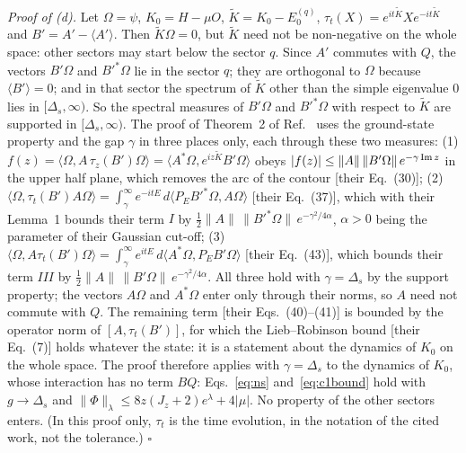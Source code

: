 \documentclass[aps,prx,onecolumn,10pt,nofootinbib,longbibliography,floatfix]{revtex4-2}
\theoremstyle{remark}
\newcommand{\Jz}{J_z}
\begin{document}
\emph{Proof of (d).} Let $\Omega=\psi$, $K_0=H-\mu O$, $\tilde K=K_0-E_0^{(q)}$, $\tau_t(X)=e^{it\tilde K}Xe^{-it\tilde K}$
and $B'=A'-\langle A'\rangle$. Then $\tilde K\Omega=0$, but $\tilde K$ need not be non-negative on the whole space:
other sectors may start below the sector $q$. Since $A'$ commutes with $Q$, the vectors $B'\Omega$ and $B'^*\Omega$
lie in the sector $q$; they are orthogonal to $\Omega$ because $\langle B'\rangle=0$; and in that sector the spectrum
of $\tilde K$ other than the simple eigenvalue $0$ lies in $[\Delta_s,\infty)$. So the spectral measures of %
$B'\Omega$ and $B'^*\Omega$ with respect to $\tilde K$ are supported in $[\Delta_s,\infty)$. The proof of Theorem~2 of %
Ref.~\cite{nachtergaele2006} uses the ground-state property and the gap $\gamma$ in three places only, each through
these two measures:
(1) $f(z)=\langle\Omega,A\,\tau_z(B')\Omega\rangle=\langle A^*\Omega,e^{iz\tilde K}B'\Omega\rangle$ obeys %
$|f(z)|\le\|A\|\,\|B'\Omega\|\,e^{-\gamma\,{\rm Im}\,z}$ in the upper half plane, which removes the arc of the contour
[their Eq.~(30)]; %
(2) $\langle\Omega,\tau_t(B')A\Omega\rangle=\int_\gamma^\infty e^{-itE}\,d\langle P_EB'^*\Omega,A\Omega\rangle$ [their %
Eq.~(37)], which with their Lemma~1 bounds their term $I$ by $\frac12\|A\|\,\|B'^*\Omega\|\,e^{-\gamma^2/4\alpha}$, %
$\alpha>0$ being the parameter of their Gaussian cut-off;
(3) $\langle\Omega,A\tau_t(B')\Omega\rangle=\int_\gamma^\infty e^{itE}\,d\langle A^*\Omega,P_EB'\Omega\rangle$ [their %
Eq.~(43)], which bounds their term $III$ by $\frac12\|A\|\,\|B'\Omega\|\,e^{-\gamma^2/4\alpha}$. %
All three hold with $\gamma=\Delta_s$ by the support property; the vectors $A\Omega$ and $A^*\Omega$ enter only through
their norms, so $A$ need not commute with $Q$. The remaining term [their Eqs.~(40)--(41)] is bounded by the operator %
norm of $[A,\tau_t(B')]$, for which the Lieb--Robinson bound [their Eq.~(7)] holds whatever the state: it is a %
statement about the dynamics of $K_0$ on the whole space. The proof therefore applies with $\gamma=\Delta_s$ to the
dynamics of $K_0$, whose interaction has no term $BQ$: Eqs.~\eqref{eq:ns} and~\eqref{eq:c1bound} hold with
$g\to\Delta_s$ and $\|\Phi\|_\lambda\le8z(\Jz+2)e^{\lambda}+4|\mu|$. No property of the other sectors enters.
(In this proof only, $\tau_t$ is the time evolution, in the notation of the cited work, not the tolerance.)
\hfill$\square$
\end{document}
